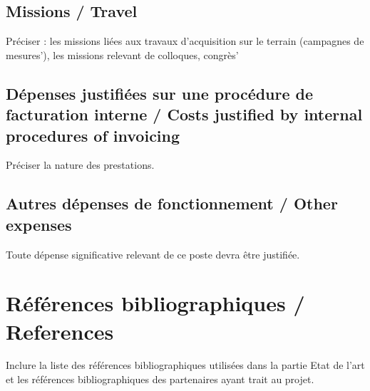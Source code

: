 \subsection{Missions / Travel}
\begin{xcomment} 
Pr\'eciser :
les missions li\'ees aux travaux d'acquisition sur le terrain (campagnes de mesures'),
les missions relevant de colloques, congr\`es'
\end{xcomment}

\subsection{D\'epenses justifi\'ees sur une proc\'edure de facturation interne / Costs justified by internal procedures of invoicing}
\begin{xcomment}  
Pr\'eciser la nature des prestations.
\end{xcomment}


\subsection{Autres d\'epenses de fonctionnement / Other expenses}
\begin{xcomment}
Toute d\'epense significative relevant de ce poste devra être justifi\'ee.
\end{xcomment}


\section{R\'ef\'erences bibliographiques / References}
\begin{xcomment}  
Inclure la liste des r\'ef\'erences bibliographiques utilis\'ees dans la partie Etat de l'art  et les r\'ef\'erences bibliographiques des partenaires ayant trait au projet.
\end{xcomment}

\endinput